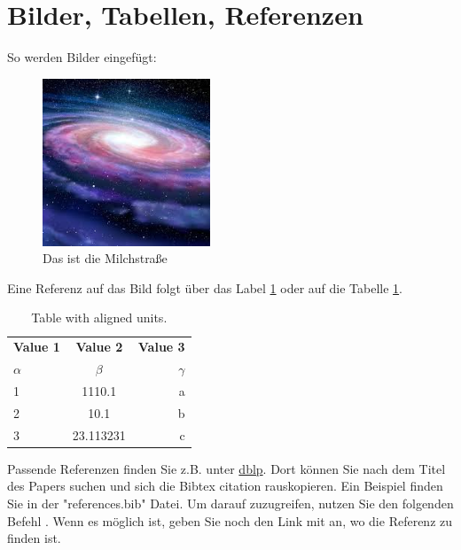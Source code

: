 \documentclass[
    a4paper,
    pagesize,
	pdftex,
    12pt,
]{scrartcl}
\begin{document}
\newpage
\section{Bilder, Tabellen, Referenzen}

So werden Bilder eingefügt:

\begin{figure}[!ht]
  \centering
  \includegraphics[width=5cm]{milkyway.jpg}
  \caption{Das ist die Milchstraße}
  \label{fig:boat1}
\end{figure}

Eine Referenz auf das Bild folgt über das Label \ref{fig:boat1} oder auf die Tabelle \ref{tab:table1}.

\begin{table}[h!]
  \begin{center}
    \label{tab:table1}
    \begin{tabular}{l|c|r} %
      \textbf{Value 1} & \textbf{Value 2} & \textbf{Value 3}\\
      $\alpha$ & $\beta$ & $\gamma$ \\
      \hline
      1 & 1110.1 & a\\
      2 & 10.1 & b\\
      3 & 23.113231 & c\\
    \end{tabular}
    \caption{Table with aligned units.}
  \end{center}
\end{table}

Passende Referenzen finden Sie z.B. unter \href{https://dblp.org/}{dblp}. Dort können Sie nach dem Titel des Papers suchen und sich die Bibtex citation rauskopieren. Ein Beispiel finden Sie in der "references.bib"  Datei. Um darauf zuzugreifen, nutzen Sie den folgenden Befehl \cite{scikit-learn}. Wenn es möglich ist, geben Sie noch den Link mit an, wo die Referenz zu finden ist.

\newpage



\end{document}
